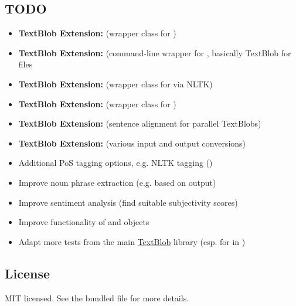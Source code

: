 \documentclass[letterpaper,10pt,english]{sphinxmanual}
\begin{document}
\subsection{TODO}
\label{readme:todo}\begin{itemize}
\item {} 
\textbf{TextBlob Extension:}  (wrapper class for )

\item {} 
\textbf{TextBlob Extension:}  (command-line wrapper for , basically TextBlob for files

\item {} 
\textbf{TextBlob Extension:}  (wrapper class for  via NLTK)

\item {} 
\textbf{TextBlob Extension:}  (wrapper class for )

\item {} 
\textbf{TextBlob Extension:}  (sentence alignment for parallel TextBlobs)

\item {} 
\textbf{TextBlob Extension:}  (various input and output conversions)

\item {} 
Additional PoS tagging options, e.g. NLTK tagging ()

\item {} 
Improve noun phrase extraction (e.g. based on  output)

\item {} 
Improve sentiment analysis (find suitable subjectivity scores)

\item {} 
Improve functionality of  and  objects

\item {} 
Adapt more tests from the main \href{http://textblob.readthedocs.org/en/dev/}{TextBlob} library (esp. for  in )

\end{itemize}


\subsection{License}
\label{readme:license}
MIT licensed. See the bundled   file for more details.
\end{document}
